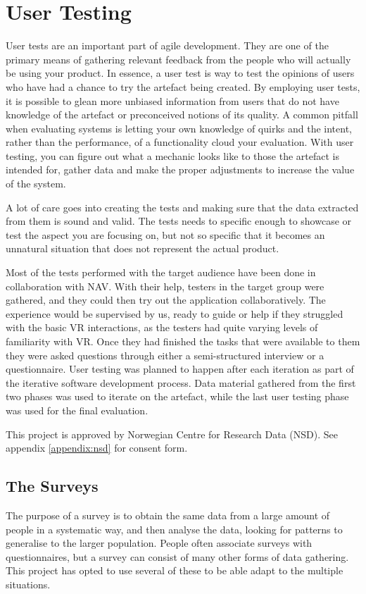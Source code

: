 \section{User Testing}
User tests are an important part of agile development. They are one of the primary means of gathering relevant feedback from the people who will actually be using your product. In essence, a user test is way to test the opinions of users who have had a chance to try the artefact being created. By employing user tests, it is possible to glean more unbiased information from users that do not have knowledge of the artefact or preconceived notions of its quality. A common pitfall when evaluating systems is letting your own knowledge of quirks and the intent, rather than the performance, of a functionality cloud your evaluation. With user testing, you can figure out what a mechanic looks like to those the artefact is intended for, gather data and make the proper adjustments to increase the value of the system.

A lot of care goes into creating the tests and making sure that the data extracted from them is sound and valid. The tests needs to specific enough to showcase or test the aspect you are focusing on, but not so specific that it becomes an unnatural situation that does not represent the actual product.


Most of the tests performed with the target audience have been done in collaboration with NAV. With their help, testers in the target group were gathered, and they could then try out the application collaboratively. The experience would be supervised by us, ready to guide or help if they struggled with the basic VR interactions, as the testers had quite varying levels of familiarity with VR. Once they had finished the tasks that were available to them they were asked questions through either a semi-structured interview or a questionnaire. User testing was planned to happen after each iteration as part of the iterative software development process. Data material gathered from the first two phases was used to iterate on the artefact, while the last user testing phase was used for the final evaluation.

This project is approved by Norwegian Centre for Research Data (NSD). See appendix \ref{appendix:nsd} for consent form.



\subsection{The Surveys}
The purpose of a survey is to obtain the same data from a large amount of people in a systematic way, and then analyse the data, looking for patterns to generalise to the larger population\cite{oates2005researching}. People often associate surveys with questionnaires, but a survey can consist of many other forms of data gathering. This project has opted to use several of these to be able adapt to the multiple situations. 

